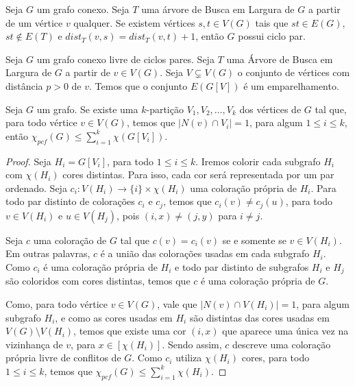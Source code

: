 \documentclass[12pt]{article}
\begin{document}
{
\begin{prop}
	\label{prop1}
	Seja $G$ um grafo conexo. Seja $T$ uma árvore de Busca em Largura de $G$ a partir de um vértice $v$ qualquer. Se existem vértices $s, t \in V(G)$ tais que $st \in E(G)$, $st \notin E(T)$ e $dist_T(v, s) = dist_T(v, t) + 1$, então $G$ possui ciclo par.
\end{prop} \newbegin

\begin{prop}
	\label{prop2}
	Seja $G$ um grafo conexo livre de ciclos pares. Seja $T$ uma Árvore de Busca em Largura de $G$ a partir de $v \in V(G)$. Seja $V \subsetneq V(G)$ o conjunto de vértices com distância $p > 0$ de $v$. Temos que o conjunto $E(G[V])$ é um emparelhamento.
\end{prop} \newbegin


\begin{lema}  
	\label{lema1}
	Seja $G$ um grafo. Se existe uma $k$-partição $V_1, V_2, \ldots ,V_k$ dos vértices de $G$ tal que, para todo vértice $v \in V(G)$, temos que $|N(v) \cap V_i| = 1$, para algum $1 \leq i \leq k$, então $\chi_{pcf}(G) \leq  \sum\limits_{i = 1}^{k} \chi(G[V_i])$.
\end{lema}

\begin{proof}
	
	Seja $H_i = G[V_i]$, para todo $1 \leq i \leq k$. Iremos colorir cada subgrafo $H_i$ com $\chi(H_i)$ cores distintas. Para isso, cada cor será representada por um par ordenado. Seja $c_i: V(H_i) \rightarrow \{ i \} \times \chi(H_i)$ uma coloração própria de $H_i$. Para todo par distinto de colorações $c_i$ e $c_j$, temos que $c_i(v) \neq c_j(u)$, para todo $ v \in V(H_i)$ e $ u \in V(H_j)$, pois $(i, x) \neq (j, y)$ para $i \neq j$.\newl
	
	Seja $c$ uma coloração de $G$ tal que $c(v) = c_i(v)$ se e somente se $v \in V(H_i)$. Em outras palavras, $c$ é a união das colorações usadas em cada subgrafo $H_i$. Como $c_i$ é uma coloração própria de $H_i$ e todo par distinto de subgrafos $H_i$ e $H_j$ são coloridos com cores distintas, temos que $c$ é uma coloração própria de $G$. \newl
	
	Como, para todo vértice $v \in V(G)$, vale que $|N(v) \cap V(H_i)| = 1$, para algum subgrafo $H_i$, e como as cores usadas em $H_i$ são distintas das cores usadas em $V(G)\setminus V(H_i)$, temos que existe uma cor $(i, x)$ que aparece uma única vez na vizinhança de $v$, para $x \in [\chi(H_i)]$. Sendo assim, $c$ descreve uma coloração própria livre de conflitos de $G$. Como $c_i$ utiliza $\chi(H_i)$ cores, para todo $1 \leq i \leq k$, temos que $\chi_{pcf}(G) \leq \sum\limits_{i = 1}^{k} \chi(H_i)$. 
	

\end{proof}}
\end{document}

